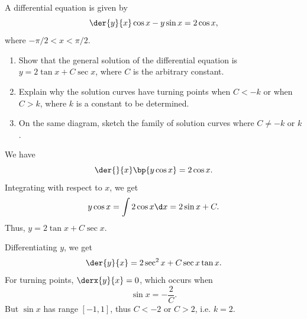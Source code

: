 \begin{problem}
    A differential equation is given by \[\der{y}{x} \cos x - y \sin x = 2 \cos x,\] where $-\pi/2 < x < \pi/2$.

    \begin{enumerate}
        \item Show that the general solution of the differential equation is $y = 2 \tan x + C \sec x$, where $C$ is the arbitrary constant.
        \item Explain why the solution curves have turning points when $C < -k$ or when $C > k$, where $k$ is a constant to be determined.
        \item On the same diagram, sketch the family of solution curves where $C \neq -k$ or $k$.
    \end{enumerate}
\end{problem}
\begin{solution}
    \begin{ppart}
        We have \[\der{}{x} \bp{y \cos x} = 2\cos x.\] Integrating with respect to $x$, we get \[y \cos x = \int 2 \cos x \d x = 2\sin x + C.\] Thus, $y = 2 \tan x + C \sec x$.
    \end{ppart}
    \begin{ppart}
        Differentiating $y$, we get \[\der{y}{x} = 2\sec^2 x + C \sec x \tan x.\] For turning points, $\derx{y}{x} = 0$, which occurs when \[\sin x = -\frac{2}{C}.\] But $\sin x$ has range $[-1, 1]$, thus $C < -2$ or $C > 2$, i.e. $k = 2$.
    \end{ppart}
    \begin{ppart}
        \begin{figure}[H]
        \centering
    \end{figure}
    \end{ppart}
\end{solution}

